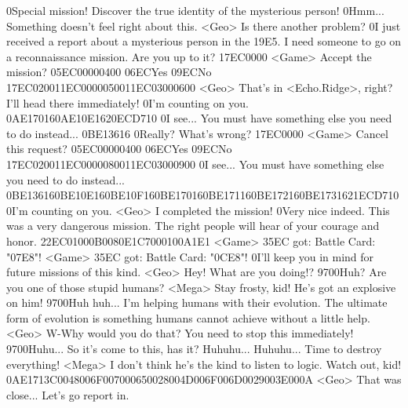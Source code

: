 0Special mission! Discover the true identity of the mysterious person! 
0Hmm... Something doesn't feel right about this. 
<Geo> Is there another problem? 
0I just received a report about a mysterious person in the {19}{E5}. 
I need someone to go on a reconnaissance mission. Are you up to it? 
{17}{EC}{00}{00} 
<Game> Accept the mission? {05}{EC}{00}{00}{04}{00}  {06}{EC}Yes   {09}{EC}No 
{17}{EC}{02}{00}{11}{EC}{00}{00}{05}{00}{11}{EC}{03}{00}{06}{00}
<Geo> That's in <Echo.Ridge>, right? I'll head there immediately! 
0I'm counting on you. 
{0A}{E1}{70}{16}{0A}{E1}{0E}{16}{20}{EC}{D7}{10}
0I see... You must have something else you need to do instead... 
{0B}{E1}{36}{16}
0Really? What's wrong? 
{17}{EC}{00}{00} 
<Game> Cancel this request? {05}{EC}{00}{00}{04}{00}  {06}{EC}Yes   {09}{EC}No 
{17}{EC}{02}{00}{11}{EC}{00}{00}{08}{00}{11}{EC}{03}{00}{09}{00}
0I see... You must have something else you need to do instead... 
{0B}{E1}{36}{16}{0B}{E1}{0E}{16}{0B}{E1}{0F}{16}{0B}{E1}{70}{16}{0B}{E1}{71}{16}{0B}{E1}{72}{16}{0B}{E1}{73}{16}{21}{EC}{D7}{10}
0I'm counting on you. 
<Geo> I completed the mission! 
0Very nice indeed. 
This was a very dangerous mission. 
The right people will hear of your courage and honor. 
{22}{EC}{01}{00}{0B}{00}{80}{E1}{C7}{00}{01}{00}{A1}{E1} 
<Game> {35}{EC} got: Battle Card: "{07}{E8}"! 
<Game> {35}{EC} got: Battle Card: "{0C}{E8}"! 
0I'll keep you in mind for future missions of this kind. 
<Geo> Hey! What are you doing!? 
{97}{00}Huh? 
Are you one of those stupid humans? 
<Mega> Stay frosty, kid! He's got an explosive on him! 
{97}{00}Huh huh... 
I'm helping humans with their evolution. The ultimate form of evolution is something 
humans cannot achieve without a little help. 
<Geo> W-Why would you do that? 
You need to stop this immediately! 
{97}{00}Huhu... So it's come to this, has it? 
Huhuhu... Huhuhu... 
Time to destroy everything! 
<Mega> I don't think he's the kind to listen to logic. 
Watch out, kid! 
{0A}{E1}{71}{3C}{00}{48}{00}{6F}{00}{70}{00}{65}{00}{28}{00}{4D}{00}{6F}{00}{6D}{00}{29}{00}{3E}{00}{0A}
<Geo> That was close... Let's go report in. 
